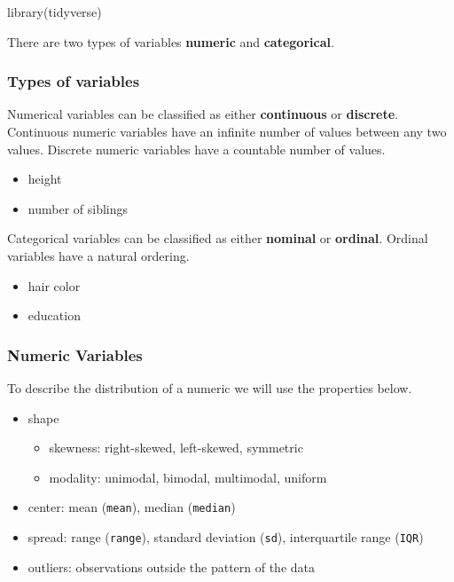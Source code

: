 \documentclass[
]{article}
\newenvironment{Shaded}{\begin{snugshade}}{\end{snugshade}}
\newcommand{\FunctionTok}[1]{\textcolor[rgb]{0.00,0.00,0.00}{#1}}
\newcommand{\NormalTok}[1]{#1}
\providecommand{\tightlist}{%
  \setlength{\itemsep}{0pt}\setlength{\parskip}{0pt}}
\begin{document}
\begin{Shaded}
\begin{Highlighting}[]
\FunctionTok{library}\NormalTok{(tidyverse)}
\end{Highlighting}
\end{Shaded}

There are two types of variables \textbf{numeric} and
\textbf{categorical}.

\hypertarget{types-of-variables}{%
\subsubsection{Types of variables}\label{types-of-variables}}

Numerical variables can be classified as either \textbf{continuous} or
\textbf{discrete}. Continuous numeric variables have an infinite number
of values between any two values. Discrete numeric variables have a
countable number of values.

\begin{itemize}
\tightlist
\item
  height
\item
  number of siblings
\end{itemize}

Categorical variables can be classified as either \textbf{nominal} or
\textbf{ordinal}. Ordinal variables have a natural ordering.

\begin{itemize}
\tightlist
\item
  hair color
\item
  education
\end{itemize}

\hypertarget{numeric-variables}{%
\subsubsection{Numeric Variables}\label{numeric-variables}}

To describe the distribution of a numeric we will use the properties
below.

\begin{itemize}
\tightlist
\item
  shape

  \begin{itemize}
  \tightlist
  \item
    skewness: right-skewed, left-skewed, symmetric
  \item
    modality: unimodal, bimodal, multimodal, uniform
  \end{itemize}
\item
  center: mean (\texttt{mean}), median (\texttt{median})
\item
  spread: range (\texttt{range}), standard deviation (\texttt{sd}),
  interquartile range (\texttt{IQR})
\item
  outliers: observations outside the pattern of the data
\end{itemize}
\end{document}
